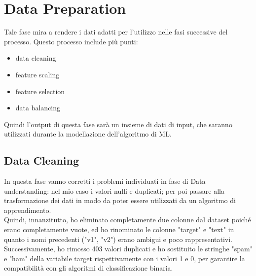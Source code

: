 \documentclass[]{article}
\begin{document}
    \section{Data Preparation}
        Tale fase mira a rendere i dati adatti per l'utilizzo nelle fasi successive del processo. Questo processo include più punti:
        \begin{itemize}
            \item data cleaning
            \item feature scaling
            \item feature selection
            \item data balancing
        \end{itemize}
         Quindi l'output di questa fase sarà un insieme di dati di input, che saranno utilizzati durante la modellazione dell'algoritmo di ML.
    \subsection{Data Cleaning}
        In questa fase vanno corretti i problemi individuati in fase di Data understanding: nel mio caso i valori nulli e duplicati; per poi passare alla trasformazione dei dati in modo da poter essere utilizzati da un algoritmo di apprendimento.\\
        Quindi, innanzitutto, ho eliminato completamente due colonne dal dataset poiché erano completamente vuote, ed ho rinominato le colonne "target" e "text" in quanto i nomi precedenti ("v1", "v2") erano ambigui e poco rappresentativi. Successivamente, ho rimosso 403 valori duplicati e ho sostituito le stringhe "spam" e "ham" della variabile target rispettivamente con i valori 1 e 0, per garantire la compatibilità con gli algoritmi di classificazione binaria.
\end{document}
